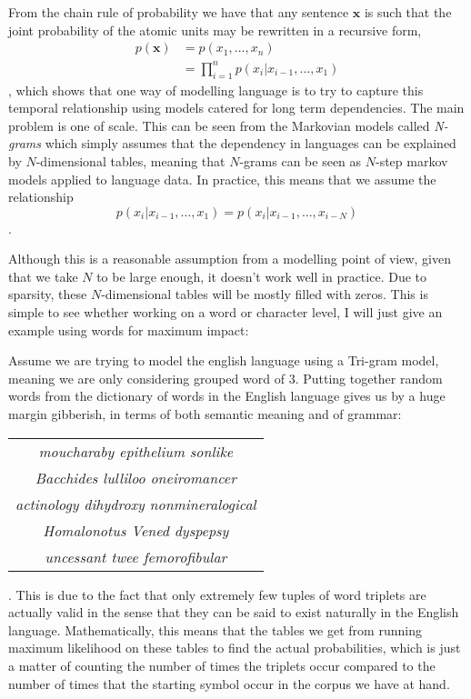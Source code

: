 From the chain rule of probability we have that any sentence $\bm{x}$ is such
that the joint probability of the atomic units may be rewritten in a recursive
form,
\begin{align*}
  p(\bm{x}) & = p(x_1, \dots, x_n) \\
            & = \prod_{i = 1}^np(x_i | x_{i - 1}, \dots, x_1)
\end{align*},
which shows that one way of modelling language is to try to capture this
temporal relationship using models catered for long term dependencies. The main
problem is one of scale. This can be seen from the Markovian models called
\textit{N-grams} which simply assumes that the dependency in languages can be
explained by $N$-dimensional tables, meaning that $N$-grams can be seen as
$N$-step markov models applied to language data. In practice, this means that we
assume the relationship
\begin{equation*}
  p(x_i | x_{i - 1}, \dots, x_1) = p(x_i | x_{i - 1}, \dots, x_{i - N})
\end{equation*}.

Although this is a reasonable assumption from a modelling point of view, given
that we take $N$ to be large enough, it doesn't work well in practice. Due to
sparsity, these $N$-dimensional tables will be mostly filled with zeros. This is
simple to see whether working on a word or character level, I will just give an
example using words for maximum impact:

Assume we are trying to model the english language using a Tri-gram model,
meaning we are only considering grouped word of 3. Putting together random words
from the dictionary of words in the English language gives us by a huge margin
gibberish, in terms of both semantic meaning and of grammar:
\begin{center}
  \begin{tabular}{ |c| } 
    \hline
    \textit{moucharaby epithelium sonlike}\\
    \textit{Bacchides lulliloo oneiromancer}\\
    \textit{actinology dihydroxy nonmineralogical}\\ 
    \textit{Homalonotus Vened dyspepsy}\\
    \textit{uncessant twee femorofibular}\\
    \hline
  \end{tabular}
\end{center}
. This is due to the fact that only extremely few tuples of word triplets are
actually valid in the sense that they can be said to exist naturally in the
English language. Mathematically, this means that the tables we get from running
maximum likelihood on these tables to find the actual probabilities, which is
just a matter of counting the number of times the triplets occur compared to the
number of times that the starting symbol occur in the corpus we have at hand.

